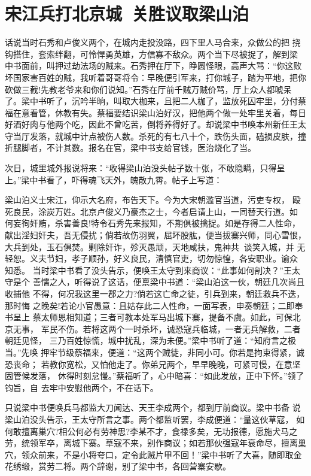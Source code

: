 \chapter{宋江兵打北京城~关胜议取梁山泊}

话说当时石秀和卢俊义两个，在城内走投没路，四下里人马合来，众做公的把
挠钩搭住，套索绊翻，可怜悍勇英雄，方信寡不敌众。两个当下尽被捉了，解到梁
中书面前，叫押过劫法场的贼来。石秀押在厅下，睁圆怪眼，高声大骂：“你这败
坏国家害百姓的贼，我听着哥哥将令：早晚便引军来，打你城子，踏为平地，把你
砍做三截!先教老爷来和你们说知。”石秀在厅前千贼万贼价骂，厅上众人都唬呆
了。梁中书听了，沉吟半晌，叫取大枷来，且把二人枷了，监放死囚牢里，分付蔡
福在意看管，休教有失。蔡福要结识梁山泊好汉，把他两个做一处牢里关着，每日
好酒好肉与他两个吃，因此不曾吃苦，倒将养得好了。却说梁中书唤本州新任王太
守当厅发落，就城中计点被伤人数。杀死的有七八十个，跌伤头面，磕损皮肤，撞
折腿脚者，不计其数。报名在官，梁中书支给官钱，医治烧化了当。

次日，城里城外报说将来：“收得梁山泊没头帖子数十张，不敢隐瞒，只得呈
上。”梁中书看了，吓得魂飞天外，魄散九霄。帖子上写道：

梁山泊义士宋江，仰示大名府，布告天下。今为大宋朝滥官当道，污吏专权，
殴死良民，涂炭万姓。北京卢俊义乃豪杰之士，今者启请上山，一同替天行道。如
何妄徇奸贿，杀害善良!特令石秀先来报知，不期俱被擒捉。如是存得二人性命，
献出淫妇奸夫，吾无侵扰；倘若故伤羽翼，屈坏股肱，便当拔寨兴师，同心雪恨，
大兵到处，玉石俱焚。剿除奸诈，殄灭愚顽，天地咸扶，鬼神共，谈笑入城，并
无轻恕。义夫节妇，孝子顺孙，好义良民，清慎官吏，切勿惊惶，各安职业。谕众
知悉。
当时梁中书看了没头告示，便唤王太守到来商议：“此事如何剖决？”王太守是个
善懦之人，听得说了这话，便禀梁中书道：“梁山泊这一伙，朝廷几次尚且收捕他
不得，何况我这里一郡之力?倘若这亡命之徒，引兵到来，朝廷救兵不迭，那时悔
之晚矣!若论小官愚意：且姑存此二人性命，一面写表，申奏朝廷；二即奉书呈上
蔡太师恩相知道；三者可教本处军马出城下寨，提备不虞。如此，可保北京无事，
军民不伤。若将这两个一时杀坏，诚恐寇兵临城，一者无兵解救，二者朝廷见怪，
三乃百姓惊慌，城中扰乱，深为未便。”梁中书听了道：“知府言之极当。”先唤
押牢节级蔡福来，便道：“这两个贼徒，非同小可。你若是拘束得紧，诚恐丧命；
若教你宽松，又怕他走了。你弟兄两个，早早晚晚，可紧可慢，在意坚固管候发落，
休得时刻怠慢。”蔡福听了，心中暗喜：“如此发放，正中下怀。”领了钧旨，自
去牢中安慰他两个，不在话下。

只说梁中书便唤兵马都监大刀闻达、天王李成两个，都到厅前商议。梁中书备
说梁山泊没头告示，王太守所言之事。两个都监听罢，李成便道：“量这伙草寇，
如何敢擅离巢穴?相公何必有劳神思?李某不才，食禄多矣，无功报德，愿施犬马之
劳，统领军卒，离城下寨。草寇不来，别作商议；如若那伙强寇年衰命尽，擅离巢
穴，领众前来，不是小将夸口，定令此贼片甲不回！”梁中书听了大喜，随即取金
花绣缎，赏劳二将。两个辞谢，别了梁中书，各回营寨安歇。

